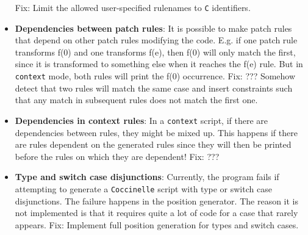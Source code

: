 \begin{itemize}
Fix: Limit the allowed user-specified rulenames to \texttt{C} identifiers.
\item \textbf{Dependencies between patch rules}: It is possible to make patch rules that depend on other patch rules modifying the code. E.g. if one patch rule transforms f(0) and one transforms f(e), then f(0) will only match the first, since it is transformed to something else when it reaches the f(e) rule. But in \texttt{context} mode, both rules will print the f(0) occurrence.\newline
Fix: ??? Somehow detect that two rules will match the same case and insert constraints such that any match in subsequent rules does not match the first one.
\item \textbf{Dependencies in context rules}: In a \texttt{context} script, if there are dependencies between rules, they might be mixed up. This happens if there are rules dependent on the generated rules since they will then be printed before the rules on which they are dependent!\newline
Fix: ???
\item \textbf{Type and switch case disjunctions}: Currently, the program fails if attempting to generate a \texttt{Coccinelle} script with type or switch case disjunctions. The failure happens in the position generator. The reason it is not implemented is that it requires quite a lot of code for a case that rarely appears.\newline
Fix: Implement full position generation for types and switch cases.
\end{itemize}
